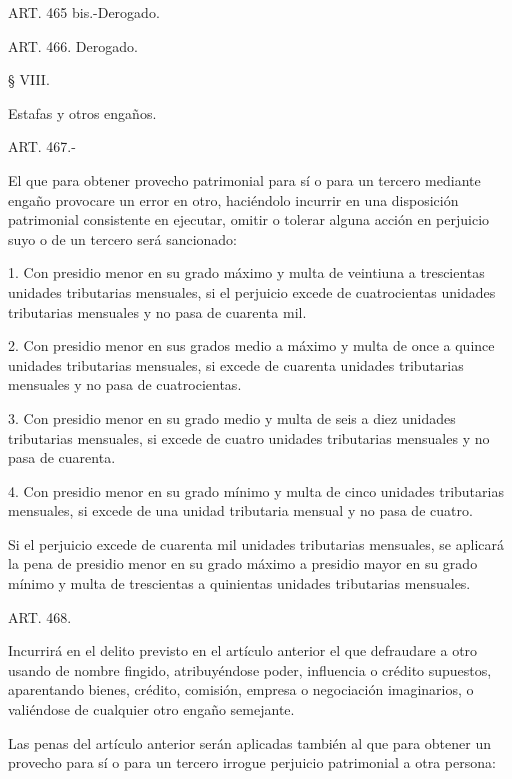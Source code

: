    ART. 465 bis.-Derogado.

    ART. 466. Derogado.





    § VIII.

    Estafas y otros engaños.





    ART. 467.-

    El que para obtener provecho patrimonial para sí o para un tercero mediante engaño provocare un error en otro, haciéndolo incurrir en una disposición patrimonial consistente en ejecutar, omitir o tolerar alguna acción en perjuicio suyo o de un tercero será sancionado:

    1. Con presidio menor en su grado máximo y multa de veintiuna a trescientas unidades tributarias mensuales, si el perjuicio excede de cuatrocientas unidades tributarias mensuales y no pasa de cuarenta mil.

    2. Con presidio menor en sus grados medio a máximo y multa de once a quince unidades tributarias mensuales, si excede de cuarenta unidades tributarias mensuales y no pasa de cuatrocientas.

    3. Con presidio menor en su grado medio y multa de seis a diez unidades tributarias mensuales, si excede de cuatro unidades tributarias mensuales y no pasa de cuarenta.

    4. Con presidio menor en su grado mínimo y multa de cinco unidades tributarias mensuales, si excede de una unidad tributaria mensual y no pasa de cuatro.

    Si el perjuicio excede de cuarenta mil unidades tributarias mensuales, se aplicará la pena de presidio menor en su grado máximo a presidio mayor en su grado mínimo y multa de trescientas a quinientas unidades tributarias mensuales.




    ART. 468.

    Incurrirá en el delito previsto en el artículo anterior el que defraudare a otro usando de nombre fingido, atribuyéndose poder, influencia o crédito supuestos, aparentando bienes, crédito, comisión, empresa o negociación imaginarios, o valiéndose de cualquier otro engaño semejante.

    Las penas del artículo anterior serán aplicadas también al que para obtener un provecho para sí o para un tercero irrogue perjuicio patrimonial a otra persona:

